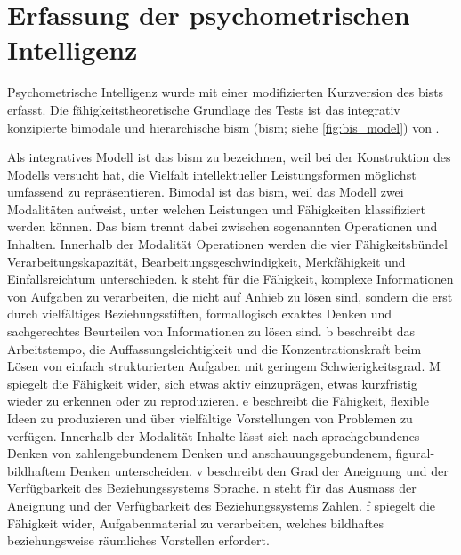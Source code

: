 \documentclass[11pt, twoside, a4paper]{book}		%
\begin{document}
\section{Erfassung der psychometrischen Intelligenz \label{sec:Erfassung_der_psychometrischen_Intelligenz}}


Psychometrische Intelligenz wurde mit einer modifizierten Kurzversion des \acrlong{bist}s \citep[\gls{bist};][]{Jaeger1997} erfasst. Die fähigkeitstheoretische Grundlage des Tests ist das integrativ konzipierte bimodale und hierarchische \acrlong{bism} (\gls{bism}; siehe \autoref{fig:bis_model}) von \citet{Jaeger1984}.

Als integratives Modell ist das \gls{bism} zu bezeichnen, weil \citet{Jaeger1984} bei der Konstruktion des Modells versucht hat, die Vielfalt intellektueller Leistungsformen möglichst umfassend zu repräsentieren.
Bimodal ist das \gls{bism}, weil das Modell zwei Modalitäten aufweist, unter welchen Leistungen und Fähigkeiten klassifiziert werden können. 
Das \gls{bism} trennt dabei zwischen sogenannten Operationen und Inhalten. Innerhalb der Modalität Operationen werden die vier Fähigkeitsbündel Verarbeitungskapazität, Bearbeitungsgeschwindigkeit, Merkfähigkeit und Einfallsreichtum unterschieden. 
\gls{k} steht für die Fähigkeit, komplexe Informationen von Aufgaben zu verarbeiten, die nicht auf Anhieb zu lösen sind, sondern die erst durch vielfältiges Beziehungsstiften, formallogisch exaktes Denken und sachgerechtes Beurteilen von Informationen zu lösen sind. 
\gls{b} beschreibt das Arbeitstempo, die Auffassungsleichtigkeit und die Konzentrationskraft beim Lösen von einfach strukturierten Aufgaben mit geringem Schwierigkeitsgrad. 
\gls{M} spiegelt die Fähigkeit wider, sich etwas aktiv einzuprägen, etwas kurzfristig wieder zu erkennen oder zu reproduzieren. 
\gls{e} beschreibt die Fähigkeit, flexible Ideen zu produzieren und über vielfältige Vorstellungen von Problemen zu verfügen. 
Innerhalb der Modalität Inhalte lässt sich nach \citet{Jaeger1984} sprachgebundenes Denken von zahlengebundenem Denken und anschauungsgebundenem, figural-bildhaftem Denken unterscheiden.
\Gls{v} beschreibt den Grad der Aneignung und der Verfügbarkeit des Beziehungssystems Sprache.
\Gls{n} steht für das Ausmass der Aneignung und der Verfügbarkeit des Beziehungssystems Zahlen.
\Gls{f} spiegelt die Fähigkeit wider, Aufgabenmaterial zu verarbeiten, welches bildhaftes beziehungsweise räumliches Vorstellen erfordert.
\end{document}
